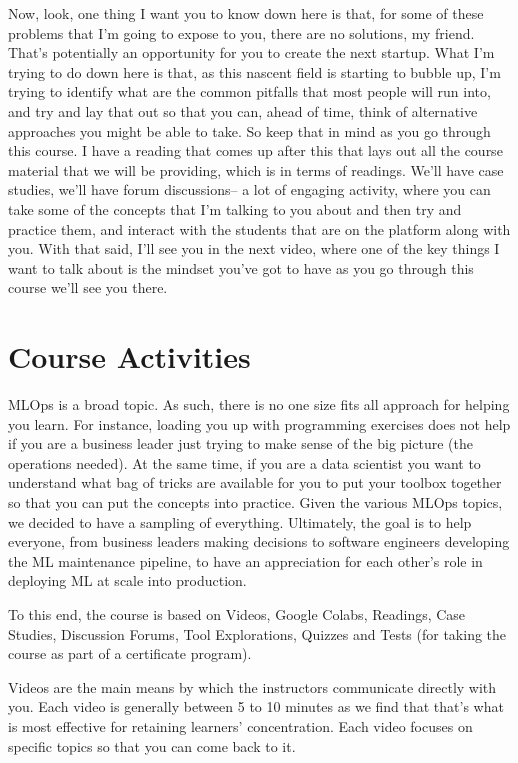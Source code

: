 Now, look, one thing I want you to know down here
is that, for some of these problems that I'm going to expose to you,
there are no solutions, my friend.
That's potentially an opportunity for you to create the next startup.
What I'm trying to do down here is that, as this nascent field is starting
to bubble up, I'm trying to identify what are the common pitfalls that most
people will run into, and try and lay that out
so that you can, ahead of time, think of alternative approaches
you might be able to take.
So keep that in mind as you go through this course.
I have a reading that comes up after this that lays out all the course
material that we will be providing, which is in terms of readings.
We'll have case studies, we'll have forum discussions-- a lot
of engaging activity, where you can take some of the concepts
that I'm talking to you about and then try and practice
them, and interact with the students that are on the platform
along with you.
With that said, I'll see you in the next video, where
one of the key things I want to talk about
is the mindset you've got to have as you go through this course
we'll see you there.

\section{Course Activities}


MLOps is a broad topic. As such, there is no one size fits all approach for helping you learn. For instance, loading you up with programming exercises does not help if you are a business leader just trying to make sense of the big picture (the operations needed). At the same time, if you are a data scientist you want to understand what bag of tricks are available for you to put your toolbox together so that you can put the concepts into practice. Given the various MLOps topics, we decided to have a sampling of everything. Ultimately, the goal is to help everyone, from business leaders making decisions to software engineers developing the ML maintenance pipeline, to have an appreciation for each other’s role in deploying ML at scale into production. 

To this end, the course is based on Videos, Google Colabs, Readings, Case Studies, Discussion Forums, Tool Explorations, Quizzes and Tests (for taking the course as part of a certificate program).

Videos are the main means by which the instructors communicate directly with you. Each video is generally between 5 to 10 minutes as we find that that’s what is most effective for retaining learners’ concentration. Each video focuses on specific topics so that you can come back to it.

